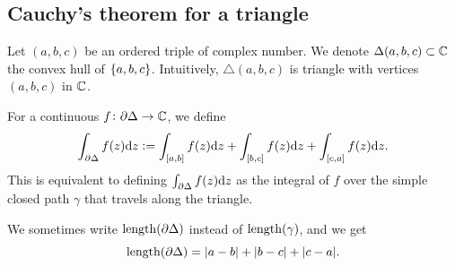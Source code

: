 \documentclass[11pt,a4paper]{article}
\begin{document}
\subsection{Cauchy's theorem for a triangle}
\begin{definition}
  Let $(a,b,c)$ be an ordered triple of complex number.
  We denote $\Delta(a,b,c) \subset \mathbb{C}$ the convex hull of $\left\{a,b,c\right\}$.
  Intuitively, $\triangle(a,b,c)$ is triangle with vertices $(a,b,c)$ in
  $\mathbb{C}$.
\end{definition}

\begin{definition}
  For a continuous $f \colon \partial \Delta \to \mathbb{C}$, we define
  \[
    \int_{\partial \Delta} f(z) \mathrm{d} z :=
    \int_{[a,b]} f(z) \mathrm{d} z +
    \int_{[b,c]} f(z) \mathrm{d} z +
    \int_{[c,a]} f(z) \mathrm{d} z.
  \]
  This is equivalent to defining $\int_{\partial \Delta} f(z) \mathrm{d} z$ as the integral
  of $f$ over the simple closed path $\gamma$ that travels along the
  triangle.
\end{definition}
\begin{remark}
  We sometimes write $\mathrm{length}(\partial \Delta)$ instead of $\mathrm{length}(\gamma)$,
  and we get
  \[
    \mathrm{length}(\partial \Delta) = |a - b| + |b - c| + |c - a|.
  \]
\end{remark}
\end{document}
